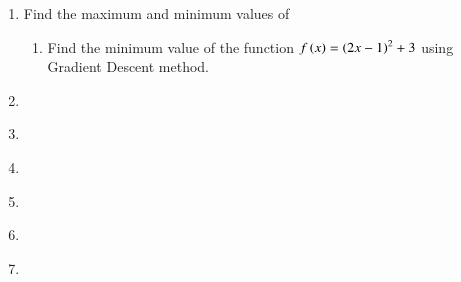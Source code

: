 \begin{enumerate}[label=\thechapter.\arabic*,ref=\thechapter.\theenumi]
\item
Find the maximum and minimum values of  
	\begin{enumerate}
\item Find the minimum value of the function $f\left(x\right) = \left(2x-1\right)^2 + 3$ using Gradient Descent method. \\ 

\solution 
\label{12/6/5/1/1/2}

	\end{enumerate}
\iffalse
\item
\label{12/6/5/2}
%
\item
\label{12/6/5/3}

\item
\label{12/6/5/4}

\item
\label{12/6/5/5}

\fi
\item
\label{12/6/5/6}

\item
\label{12/6/5/7}

\item
\label{12/6/5/8}

\iffalse
\item
\label{12/6/5/9}
%
\fi
\item
\label{12/6/5/10}

\item
\label{12/6/5/11}

\item
\label{12/6/6/14}


\end{enumerate}
